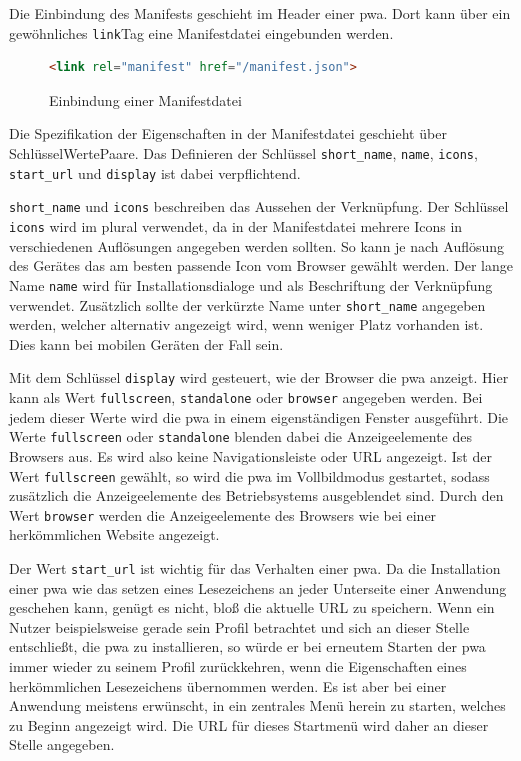 \documentclass[12pt, parskip=half]{scrartcl}       %
\begin{document}
Die Einbindung des Manifests geschieht im Header einer \ac{pwa}.
Dort kann über ein gewöhnliches \texttt{link}\-Tag eine Manifestdatei eingebunden werden.

\begin{figure}[h]
\begin{lstlisting}[language=HTML]
                <link rel="manifest" href="/manifest.json">
\end{lstlisting}
\caption{Einbindung einer Manifestdatei}
\label{fig:html_linkmanifest}
\end{figure}

Die Spezifikation der Eigenschaften in der Manifestdatei geschieht über Schlüssel\-Werte\-Paare.
Das Definieren der Schlüssel \texttt{short\_name}, \texttt{name}, \texttt{icons}, \texttt{start\_url} und \texttt{display} ist dabei verpflichtend.

\texttt{short\_name} und \texttt{icons} beschreiben das Aussehen der Verknüpfung.
Der Schlüssel \texttt{icons} wird im plural verwendet, da in der Manifestdatei mehrere Icons in verschiedenen Auflösungen angegeben werden sollten.
So kann je nach Auflösung des Gerätes das am besten passende Icon vom Browser gewählt werden.
Der lange Name \texttt{name} wird für Installationsdialoge und als Beschriftung der Verknüpfung verwendet.
Zusätzlich sollte der verkürzte Name unter \texttt{short\_name} angegeben werden, welcher alternativ angezeigt wird, wenn weniger Platz vorhanden ist\cite{chromedevs_manifestname}.
Dies kann bei mobilen Geräten der Fall sein.

Mit dem Schlüssel \texttt{display} wird gesteuert, wie der Browser die \ac{pwa} anzeigt.
Hier kann als Wert \texttt{fullscreen}, \texttt{standalone} oder \texttt{browser} angegeben werden.
Bei jedem dieser Werte wird die \ac{pwa} in einem eigenständigen Fenster ausgeführt.
Die Werte \texttt{fullscreen} oder \texttt{standalone} blenden dabei die Anzeigeelemente des Browsers aus.
Es wird also keine Navigationsleiste oder URL angezeigt.
Ist der Wert \texttt{fullscreen} gewählt, so wird die \ac{pwa} im Vollbildmodus gestartet, sodass zusätzlich die Anzeigeelemente des Betriebsystems ausgeblendet sind.
Durch den Wert \texttt{browser} werden die Anzeigeelemente des Browsers wie bei einer herkömmlichen Website angezeigt\cite{googledev_manifest}.

Der Wert \texttt{start\_url} ist wichtig für das Verhalten einer \ac{pwa}.
Da die Installation einer \ac{pwa} wie das setzen eines Lesezeichens an jeder Unterseite einer Anwendung geschehen kann, genügt es nicht, bloß die aktuelle URL zu speichern.
Wenn ein Nutzer beispielsweise gerade sein Profil betrachtet und sich an dieser Stelle entschließt, die \ac{pwa} zu installieren, so würde er bei erneutem Starten der \ac{pwa} immer wieder zu seinem Profil zurückkehren, wenn die Eigenschaften eines herkömmlichen Lesezeichens übernommen werden.
Es ist aber bei einer Anwendung meistens erwünscht, in ein zentrales Menü herein zu starten, welches zu Beginn angezeigt wird.
Die URL für dieses Startmenü wird daher an dieser Stelle angegeben.
\end{document}
